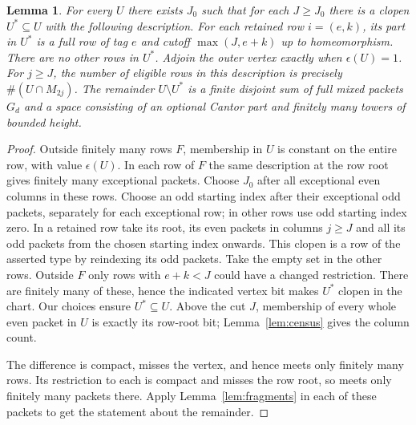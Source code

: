 \documentclass[11pt,letterpaper]{article}
\newtheorem{lemma}[theorem]{Lemma}
\theoremstyle{definition}\newtheorem{definition}[theorem]{Definition}
\begin{document}
\begin{lemma}\label{lem:core}
For every \(U\) there exists \(J_0\) such that for each \(J\ge J_0\)
there is a clopen \(U^*\subseteq U\) with the following description.
For each retained row \(i=(e,k)\), its part in \(U^*\) is a full row of
tag \(e\) and cutoff \(\max(J,e+k)\) up to homeomorphism. There are no
other rows in \(U^*\). Adjoin the outer vertex exactly when
\(\epsilon(U)=1\). For \(j\ge J\), the number of eligible rows in this
description is precisely \(\#(U\cap M_{2j})\).
The remainder \(U\setminus U^*\) is a finite disjoint sum of full mixed
packets \(G_d\) and a space consisting of an optional Cantor part and
finitely many towers of bounded height.
\end{lemma}
\begin{proof}
Outside finitely many rows \(F\), membership in \(U\) is constant on the
entire row, with value \(\epsilon(U)\). In each row of \(F\) the same
description at the row root gives finitely many exceptional packets.
Choose \(J_0\) after all exceptional even columns in these rows. Choose
an odd starting index after their exceptional odd packets, separately
for each exceptional row; in other rows use odd starting index zero.
In a retained row take its root, its even packets in columns \(j\ge J\)
and all its odd packets from the chosen starting index onwards. This
clopen is a row of the asserted type by reindexing its odd packets.
Take the empty set in the other rows. Outside \(F\) only rows with
\(e+k<J\) could have a changed restriction. There are finitely many of
these, hence the indicated vertex bit makes \(U^*\) clopen in the chart.
Our choices ensure \(U^*\subseteq U\). Above the cut \(J\), membership
of every whole even packet in \(U\) is exactly its row-root bit;
Lemma~\ref{lem:census} gives the column count.

The difference is compact, misses the vertex, and hence meets only
finitely many rows. Its restriction to each is compact and misses the
row root, so meets only finitely many packets there. Apply
Lemma~\ref{lem:fragments} in each of these packets to get the statement
about the remainder.
\end{proof}
\end{document}
